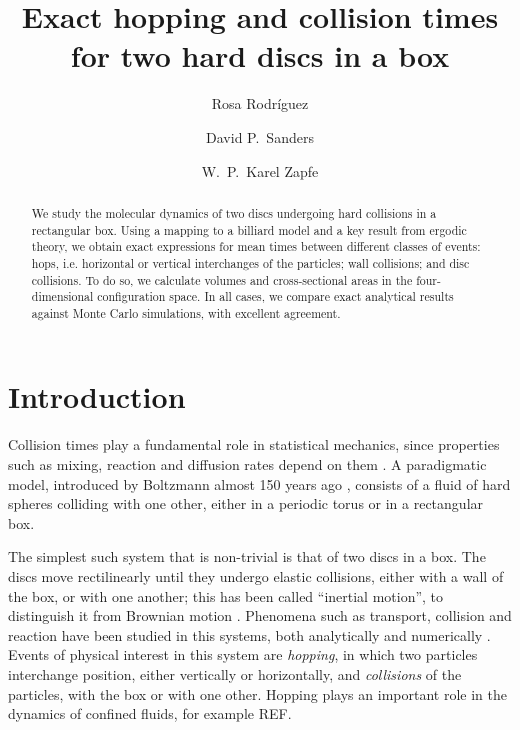 \documentclass[superscriptaddress,pre,reprint,showpacs,twocolumn]{revtex4-1}
\begin{document}
\title{Exact hopping and collision times for two hard discs in a box}

\author{Rosa Rodríguez}

\author{David P.~Sanders}

\author{W.~P.~Karel Zapfe}



\begin{abstract}
We study the molecular dynamics of two discs undergoing hard collisions in a rectangular box.
Using a mapping to a billiard model and a key result from ergodic theory, we obtain exact expressions for mean times between different classes of events:
hops, i.e. horizontal or vertical interchanges of the particles; wall collisions; and disc collisions.
To do so, we calculate
volumes and cross-sectional areas in the four-dimensional configuration space.
In all cases, we compare exact analytical results against Monte Carlo simulations, with excellent agreement.
\end{abstract}

\maketitle



\section{Introduction}


Collision times play a fundamental role in statistical mechanics, since properties
such as mixing, reaction and diffusion rates depend on them \cite{Boltz72, Tolman, VanKampen}.
A paradigmatic model, introduced by Boltzmann almost 150 years ago \cite{Boltz72, SzaszBook00},
consists of a fluid of hard spheres colliding with one other, either in a periodic torus or in
a rectangular box.

The simplest such system that is non-trivial is that of two discs in a box.
The discs move rectilinearly until they undergo
elastic collisions, either with a wall of the box, or with one another; this has been called ``inertial motion'', to distinguish it from Brownian motion \cite{Bowles04}.
Phenomena such as transport, collision and reaction
have been studied in this systems, both analytically 
 \cite{Awazu01, Munakata02, Suh05} and numerically \cite{MacElroy2004, MacElroy2005}.
 Events of physical interest in this system are \emph{hopping},
in which two particles interchange position, either vertically or horizontally,
and \emph{collisions} of the particles, with the box or with one other. Hopping plays an important role in the dynamics of confined fluids, for example
REF.
\end{document}
